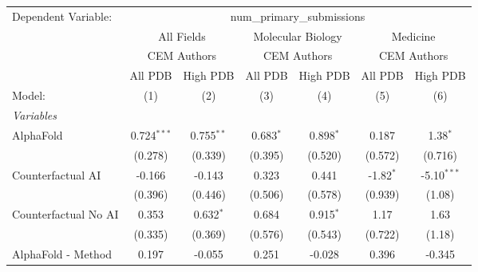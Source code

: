 \begingroup
\centering
\begin{tabular}{lcccccc}
   \tabularnewline \midrule \midrule
   Dependent Variable: & \multicolumn{6}{c}{num\_primary\_submissions}\\
 & \multicolumn{2}{c}{All Fields} & \multicolumn{2}{c}{Molecular Biology} & \multicolumn{2}{c}{Medicine} \\
\cmidrule(lr){2-3} \cmidrule(lr){4-5} \cmidrule(lr){6-7}
 & \multicolumn{2}{c}{CEM Authors} & \multicolumn{2}{c}{CEM Authors} & \multicolumn{2}{c}{CEM Authors} \\
\cmidrule(lr){2-3} \cmidrule(lr){4-5} \cmidrule(lr){6-7}
 & \multicolumn{1}{c}{All PDB} & \multicolumn{1}{c}{High PDB} & \multicolumn{1}{c}{All PDB} & \multicolumn{1}{c}{High PDB} & \multicolumn{1}{c}{All PDB} & \multicolumn{1}{c}{High PDB} \\
\cmidrule(lr){2-2} \cmidrule(lr){3-3} \cmidrule(lr){4-4} \cmidrule(lr){5-5} \cmidrule(lr){6-6} \cmidrule(lr){7-7}
   Model:                                                     & (1)           & (2)           & (3)           & (4)          & (5)           & (6)\\  
   \midrule
   \emph{Variables}\\
   AlphaFold                                                  & 0.724$^{***}$ & 0.755$^{**}$  & 0.683$^{*}$   & 0.898$^{*}$  & 0.187         & 1.38$^{*}$\\   
                                                              & (0.278)       & (0.339)       & (0.395)       & (0.520)      & (0.572)       & (0.716)\\   
   Counterfactual AI                                          & -0.166        & -0.143        & 0.323         & 0.441        & -1.82$^{*}$   & -5.10$^{***}$\\   
                                                              & (0.396)       & (0.446)       & (0.506)       & (0.578)      & (0.939)       & (1.08)\\   
   Counterfactual No AI                                       & 0.353         & 0.632$^{*}$   & 0.684         & 0.915$^{*}$  & 1.17          & 1.63\\   
                                                              & (0.335)       & (0.369)       & (0.576)       & (0.543)      & (0.722)       & (1.18)\\   
   AlphaFold - Method                                         & 0.197         & -0.055        & 0.251         & -0.028       & 0.396         & -0.345\\   

\end{tabular}
